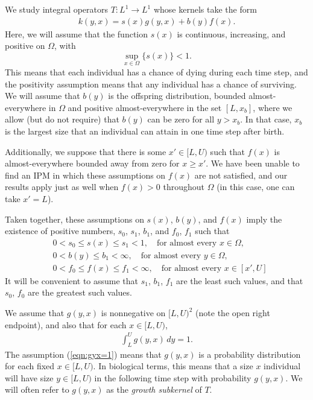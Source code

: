 We study integral operators $T:L^1 \to L^1$ whose kernels take the form
\begin{align}
	k(y,x) = s(x) g(y,x) + b(y) f(x). \label{eqn:kernel}
\end{align}
Here, we will assume that the function $s(x)$ is continuous, increasing, and positive on $\Omega$, with 
\[\sup_{x \in \Omega} \{s(x)\} < 1.\]
This means that each individual has a chance of dying during each time step, and the positivity assumption means that any individual has a chance of surviving. We will assume that $b(y)$ is the offspring distribution, bounded almost-everywhere in $\Omega$ and positive almost-everywhere in the set $[L, x_b]$, where we allow (but do not require) that $b(y)$ can be zero for all $y > x_b$. In that case, $x_b$ is the largest size that an individual can attain in one time step after birth.

Additionally, we suppose that there is some $x' \in [L, U)$ such that $f(x)$ is almost-everywhere bounded away from zero for $x \geq x'$. We have been unable to find an IPM in which these assumptions on $f(x)$ are not satisfied, and our results apply just as well when $f(x) > 0$ throughout $\Omega$ (in this case, one can take $x' = L$).

Taken together, these assumptions on $s(x)$, $b(y)$, and $f(x)$ imply the existence of positive numbers, $s_0$, $s_1$, $b_1$, and $f_0$, $f_1$ such that
\begin{align}
	&0 < s_0 \leq s(x) \leq s_1 < 1, \quad \text{for almost every } x \in \Omega, \label{eqn:s(x)bounds} \\
	&0 < b(y) \leq b_1 < \infty, \quad \text{for almost every } y \in \Omega, \label{eqn:b(y)bounds} \\
	&0 < f_0 \leq f(x) \leq f_1 < \infty, \quad \text{for almost every } x \in [x', U] \label{eqn:f(x)bounds}
\end{align}
It will be convenient to assume that $s_1$, $b_1$, $f_1$ are the least such values, and that $s_0$, $f_0$ are the greatest such values.

We assume that $g(y,x)$ is nonnegative on $[L,U)^2$ (note the open right endpoint), and also that for each $x \in [L,U)$,
\begin{align}\int_L^U g(y,x) \, dy = 1. \label{eqn:gyx=1}\end{align}
The assumption (\ref{eqn:gyx=1}) means that $g(y,x)$ is a probability distribution for each fixed $x \in [L, U)$. In biological terms, this means that a size $x$ individual will have size $y \in [L,U)$ in the following time step with probability $g(y, x)$. We will often refer to $g(y,x)$ as the \emph{growth subkernel} of $T$.

